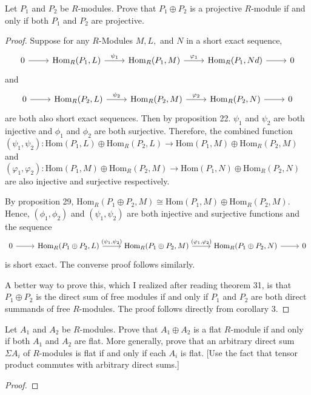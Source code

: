 \documentclass[10pt]{article}
\newenvironment{problem}[2][Problem]{\begin{trivlist}
		\item[\hskip \labelsep {\bfseries #1}\hskip \labelsep {\bfseries #2.}]}{\end{trivlist}}
\begin{document}
	\begin{problem}{5.3}
		Let $P_1$ and $P_2$ be $R$-modules. Prove that $P_1 \oplus P_2$ is a projective $R$-module if and only if both $P_1$ and $P_2$ are projective.
		\begin{proof}
			Suppose for any $R$-Modules $M, L,$ and $N$ in a short exact sequence,
			\[ \begin{tikzcd}
				0 \arrow{r} & \text{Hom}_R(P_1,L) \arrow{r}{\psi_1} & \text{Hom}_R(P_1,M) \arrow{r}{\varphi_1} & \text{Hom}_R(P_1,Nd) \arrow{r} & 0
			\end{tikzcd}
			\]
			and
			\[ \begin{tikzcd}
				0 \arrow{r} & \text{Hom}_R(P_2,L) \arrow{r}{\psi_2} & \text{Hom}_R(P_2,M) \arrow{r}{\varphi_2} & \text{Hom}_R(P_2,N) \arrow{r} & 0
			\end{tikzcd}
			\]
			are both also short exact sequences. Then by proposition 22. $\psi_1$ and $\psi_2$ are both injective and $\phi_1$ and $\phi_2$ are both surjective. Therefore, the combined function $(\psi_1, \psi_2) : \text{Hom}(P_1,L)\oplus \text{Hom}_R(P_2,L) \rightarrow \text{Hom}(P_1,M)\oplus \text{Hom}_R(P_2,M)$ and $(\varphi_1, \varphi_2) : \text{Hom}(P_1,M)\oplus \text{Hom}_R(P_2,M) \rightarrow \text{Hom}(P_1,N)\oplus \text{Hom}_R(P_2,N)$ are also injective and surjective respectively.
			
			By proposition 29, $\text{Hom}_R(P_1 \oplus P_2, M) \cong \text{Hom}(P_1,M)\oplus \text{Hom}_R(P_2,M)$. Hence, $(\phi_1, \phi_2)$ and $(\psi_1, \psi_2)$ are both injective and surjective functions and the sequence
			\[ \begin{tikzcd}
				0 \arrow{r} & \text{Hom}_R(P_1 \oplus P_2,L) \arrow{r}{(\psi_1, \psi_2)} & \text{Hom}_R(P_1 \oplus P_2,M) \arrow{r}{(\varphi_1, \varphi_2)} & \text{Hom}_R(P_1 \oplus P_2,N) \arrow{r} & 0
			\end{tikzcd}
			\]
			is short exact. The converse proof follows similarly.
			
			A better way to prove this, which I realized after reading theorem 31, is that $P_1 \oplus P_2$ is the direct sum of free modules if and only if $P_1$ and $P_2$ are both direct summands of free $R$-modules. The proof follows directly from corollary 3.
		\end{proof}
	\end{problem}
	
	\begin{problem}{5.5}
		Let $A_1$ and $A_2$ be $R$-modules. Prove that $A_1 \oplus A_2$ is a flat $R$-module if and only if both $A_1$ and $A_2$ are flat. More generally, prove that an arbitrary direct sum $\Sigma A_i$ of $R$-modules is flat if and only if each $A_i$ is flat. [Use the fact that tensor product commutes with arbitrary direct sums.]
		\begin{proof}
			
		\end{proof}
	\end{problem}
\end{document}
